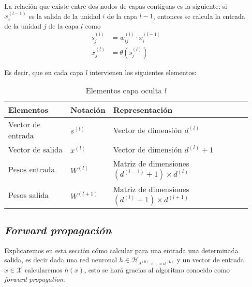 La relación que existe entre dos nodos de capas contiguas es la siguiente: si $x_i^{(l-1)}$ es la salida de la unidad $i$ de la capa $l-1$, 
entonces se calcula la entrada de la unidad $j$ de la capa $l$ como 
\begin{align}\label{eq:construcción_red_neuronas:calculo_una_capa_oculta}
    s_j^{(l)} &= w_{i j}^{(l)} \cdot x_i^{(l-1)}  \\
    x_j^{(l)} &= \theta(s_j^{(l)})
\end{align}

Es decir, que en cada capa $l$ intervienen los siguientes elementos:  
\begin{table}[h]
    \begin{center}
    \begin{tabular}{| l | l | l |}
    \hline
    Elementos & Notación & Representación 
    \\ \hline
    Vector de entrada & $s^{(l)}$ &  Vector de dimensión $d^{(l)}$ \\
    Vector de salida & $x^{(l)}$ &  Vector de dimensión $d^{(l)}+ 1$ \\
    Pesos entrada & $W^{(l)}$ & Matriz de dimensiones $(d^{(l-1)}+1) \times d^{(l)}$ \\
    Pesos salida & $W^{(l+1)}$ 
    & Matriz de dimensiones $(d^{(l)}+1) \times d^{(l+1)}$ \\
    \hline
    \end{tabular}
    \caption{Elementos capa oculta $l$}
    \label{tab:rrnn_elementos_capa_oculta}
    \end{center}
\end{table}

\subsection{ \textit{Forward propagación}}\label{algoritmo-forward-propagation}

Explicaremos en esta sección cómo calcular para una entrada una determinada salida, es decir
dada una red neuronal $h \in \mathcal{H}_{d^{(0)} \times \cdots \times d^{(L)}}$ y un vector de entrada $x \in \mathcal{X}$ calcularemos  $h(x)$, esto se hará gracias al algoritmo conocido como \textit{forward propagation}.

